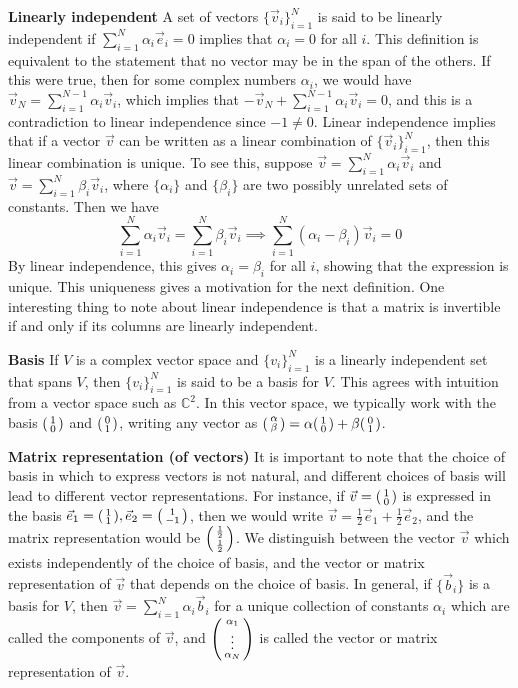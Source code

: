 \documentclass{article}
\begin{document}
\textbf{Linearly independent} A set of vectors $\{\vec v_i\}_{i=1}^N$ is said to be linearly independent if $\sum_{i=1}^N\alpha_i \vec e_i = 0$ implies that $\alpha_i = 0$ for all $i$. This definition is equivalent to the statement that no vector may be in the span of the others. If this were true, then for some complex numbers $\alpha_i$, we would have $\vec v_N = \sum_{i=1}^{N-1}\alpha_i\vec v_i$, which implies that $-\vec v_N + \sum_{i=1}^{N-1}\alpha_i\vec v_i = 0$, and this is a contradiction to linear independence since $-1 \neq 0$. Linear independence implies that if a vector $\vec v$ can be written as a linear combination of $\{\vec v_i\}_{i=1}^N$, then this linear combination is unique. To see this, suppose $\vec v = \sum_{i=1}^N\alpha_i \vec v_i$ and $\vec v = \sum_{i=1}^N \beta_i \vec v_i$, where $\{\alpha_i\}$ and $\{\beta_i\}$ are two possibly unrelated sets of constants. Then we have
$$
\sum_{i=1}^N \alpha_i \vec v_i = \sum_{i=1}^N\beta_i\vec v_i \implies \sum_{i=1}^N (\alpha_i-\beta_i)\vec v_i = 0
$$
By linear independence, this gives $\alpha_i = \beta_i$ for all $i$, showing that the expression is unique. This uniqueness gives a motivation for the next definition. One interesting thing to note about linear independence is that a matrix is invertible if and only if its columns are linearly independent.

\textbf{Basis}
If $V$ is a complex vector space and $\{v_i\}_{i=1}^N$ is a linearly independent set that spans $V$, then $\{v_i\}_{i=1}^N$ is said to be a basis for $V$. This agrees with intuition from a vector space such as $\mathbb C^2$. In this vector space, we typically work with the basis $\smqty(1 \\ 0)$ and $\smqty(0 \\ 1)$, writing any vector as $\smqty(\alpha \\ \beta) = \alpha\smqty(1 \\ 0) + \beta\smqty(0 \\ 1)$. 

\textbf{Matrix representation (of vectors)}
It is important to note that the choice of basis in which to express vectors is not natural, and different choices of basis will lead to different vector representations. For instance, if $\vec v = \smqty(1 \\ 0)$ is expressed in the basis $\vec e_1 = \smqty(1 \\ 1), \vec e_2 = \smqty(1 \\ -1)$, then we would write $\vec v= \frac{1}{2}\vec e_1 + \frac{1}{2}\vec e_2$, and the matrix representation would be $\smqty(\frac{1}{2} \\ \frac{1}{2})$. We distinguish between the vector $\vec v$ which exists independently of the choice of basis, and the vector or matrix representation of $\vec v$ that depends on the choice of basis. In general, if $\{\vec b_i\}$ is a basis for $V$, then $\vec v = \sum_{i=1}^N \alpha_i\vec b_i$ for a unique collection of constants $\alpha_i$ which are called the components of $\vec v$, and $\smqty(\alpha_1 \\ \vdots \\ \alpha_N)$ is called the vector or matrix representation of $\vec v$.
\end{document}
